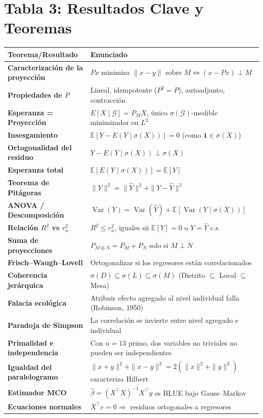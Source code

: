 \documentclass[11pt]{article}
\newcommand{\E}{\mathbb{E}}
\newcommand{\Var}{\operatorname{Var}}
\newcommand{\sg}{\sigma}
\begin{document}
\section*{Tabla 3: Resultados Clave y Teoremas}
\vspace{0.3em}
\begin{center}
\small
\begin{tabular}{@{}p{5.0cm}p{8.0cm}@{}}
\toprule
\textbf{Teorema/Resultado} & \textbf{Enunciado}\\
\midrule
\textbf{Caracterización de la proyección} & $Px$ minimiza $\|x-y\|$ sobre $M\iff(x-Px)\perp M$\\
\textbf{Propiedades de $P$} & Lineal, idempotente ($P^2=P$), autoadjunto, contracción\\
\textbf{Esperanza = Proyección} & $E[X\mid\mathcal G]=P_M X$, único $\sg(\mathcal G)$-medible minimizador en $L^2$\\
\textbf{Insesgamiento} & $\E[Y-E(Y\mid\sg(X))]=0$ (como $\mathbf 1\in\sg(X)$)\\
\textbf{Ortogonalidad del residuo} & $Y-E(Y\mid\sg(X))\perp\sg(X)$\\
\textbf{Esperanza total} & $\E[E(Y\mid\sg(X))]=\E[Y]$\\
\textbf{Teorema de Pitágoras} & $\|Y\|^2=\|\hat Y\|^2+\|Y-\hat Y\|^2$\\
\textbf{ANOVA / Descomposición} & $\Var(Y)=\Var(\hat Y)+\E[\Var(Y\mid\sg(X))]$\\
\textbf{Relación $R^2$ vs $r_n^2$} & $R^2\le r_n^2$, iguales sii $\E[Y]=0$ o $Y=\hat Y$ c.s.\\
\textbf{Suma de proyecciones} & $P_{M\oplus N}=P_M+P_N$ solo si $M\perp N$\\
\textbf{Frisch--Waugh--Lovell} & Ortogonalizar si los regresores están correlacionados\\
\textbf{Coherencia jerárquica} & $\sg(D)\subseteq\sg(L)\subseteq\sg(M)$ (Distrito $\subseteq$ Local $\subseteq$ Mesa)\\
\textbf{Falacia ecológica} & Atribuir efecto agregado al nivel individual falla (Robinson, 1950)\\
\textbf{Paradoja de Simpson} & La correlación se invierte entre nivel agregado e individual\\
\textbf{Primalidad e independencia} & Con $n=13$ primo, dos variables no triviales no pueden ser independientes\\
\textbf{Igualdad del paralelogramo} & $\|x+y\|^2+\|x-y\|^2=2(\|x\|^2+\|y\|^2)$ caracteriza Hilbert\\
\textbf{Estimador MCO} & $\hat\beta=(X^\top X)^{-1}X^\top y$ es BLUE bajo Gauss--Markov\\
\textbf{Ecuaciones normales} & $X^\top e=0 \Rightarrow$ residuos ortogonales a regresores\\
\bottomrule
\end{tabular}
\end{center}
\end{document}
